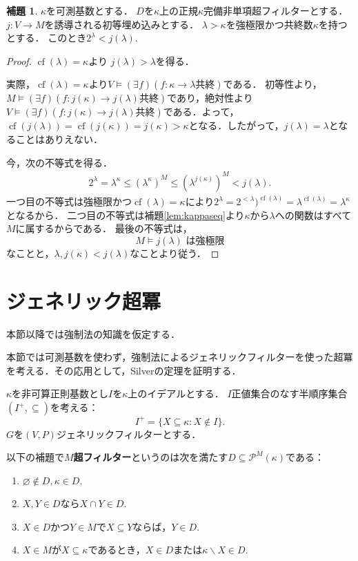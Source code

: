 \documentclass[uplatex]{jsarticle}
\newcommand{\Pow}{\mathcal{P}}
\newcommand{\cf}{\operatorname{cf}}
\renewcommand\emptyset{\varnothing}
\renewcommand\subset{\subseteq}
\renewcommand{\setminus}{\smallsetminus}
\theoremstyle{definition}
\newtheorem{lem}[thm]{補題}
\begin{document}
	\begin{lem}
		$\kappa$を可測基数とする．
		$D$を$\kappa$上の正規$\kappa$完備非単項超フィルターとする．
		$j \colon V \to M$を誘導される初等埋め込みとする．
		$\lambda > \kappa$を強極限かつ共終数$\kappa$を持つとする．
		このとき$2^\lambda < j(\lambda)$.
	\end{lem}
	\begin{proof}
		$\cf(\lambda) = \kappa$より $j(\lambda) > \lambda$を得る．
		
		実際，$\cf(\lambda) = \kappa$より$V \models (\exists f)(f \colon \kappa \to \lambda \text{共終})$である．
		初等性より，$M \models (\exists f)(f \colon j(\kappa) \to j(\lambda) \text{共終})$であり，絶対性より$V \models (\exists f)(f \colon j(\kappa) \to j(\lambda) \text{共終})$である．よって，$\cf(j(\lambda)) = \cf(j(\kappa)) = j(\kappa) > \kappa$となる．したがって，$j(\lambda) = \lambda$となることはありえない．
		
		今，次の不等式を得る．
		\begin{align*}
			2^\lambda = \lambda^\kappa \le (\lambda^\kappa)^M \le (\lambda^{j(\kappa)})^M < j(\lambda).
		\end{align*}
		一つ目の不等式は強極限かつ$\cf(\lambda)=\kappa$により$2^\lambda = 2^{<\lambda})^{\cf(\lambda)} = \lambda^{\cf(\lambda)} = \lambda^\kappa$となるから．
		二つ目の不等式は補題\ref{lem:kappaseq}より$\kappa$から$\lambda$への関数はすべて$M$に属するからである．
		最後の不等式は，
		\[
		M \models j(\lambda) \text{ は強極限}
		\]
		なことと，$\lambda, j(\kappa) < j(\lambda)$なことより従う．
	\end{proof}
	
	\section{ジェネリック超冪}
	
	本節以降では強制法の知識を仮定する．
	
	本節では可測基数を使わず，強制法によるジェネリックフィルターを使った超冪を考える．その応用として，Silverの定理を証明する．
	
	$\kappa$を非可算正則基数とし$I$を$\kappa$上のイデアルとする．
	$I$正値集合のなす半順序集合$(I^+, \subset)$を考える：
	\[
	I^+ = \{ X \subset \kappa : X \not \in I \}.
	\]
	$G$を$(V, P)$ジェネリックフィルターとする．
	
	以下の補題で\textbf{$M$超フィルター}というのは次を満たす$D \subset \Pow^M(\kappa)$である：
	\begin{enumerate}
		\item $\emptyset \not \in D, \kappa \in D$.
		\item $X, Y \in D$なら$X \cap Y \in D$.
		\item $X \in D$かつ$Y \in M$で$X \subset Y$ならば，$Y \in D$.
		\item $X \in M$が$X \subset \kappa$であるとき，$X \in D$または$\kappa \setminus X \in D$.
	\end{enumerate}
	
\end{document}
